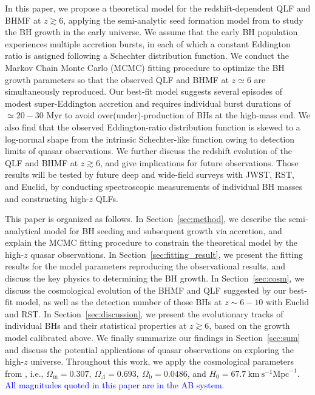 \documentclass[twocolumn, twocolappendix]{aastex63}
\newcommand{\blue}[1]{\textcolor{blue}{ #1}}
\begin{document}
\begin{CJK*}{UTF8}{gbsn}
In this paper, we propose a theoretical model for the redshift-dependent QLF and BHMF at $z\gtrsim 6$,
applying the semi-analytic seed formation model from \cite{2021ApJ...917...60L} to study the BH growth in the early universe.
We assume that the early BH population experiences multiple accretion bursts, in each of which a constant Eddington ratio is assigned 
following a Schechter distribution function. 
We conduct the Markov Chain Monte Carlo (MCMC) fitting procedure to optimize the BH growth parameters 
so that the observed QLF and BHMF at $z\simeq 6$ are simultaneously reproduced. 
Our best-fit model suggests several episodes of modest super-Eddington accretion and requires
individual burst durations of $\simeq 20-30$ Myr to avoid over(under)-production of BHs at the high-mass end.
We also find that the observed Eddington-ratio distribution function is skewed to a log-normal shape from the intrinsic Schechter-like function
owing to detection limits of quasar observations.
We further discuss the redshift evolution of the QLF and BHMF at $z\gtrsim 6$,
and give implications for future observations.
Those results will be tested by future deep and wide-field surveys with JWST, RST, and Euclid,
by conducting spectroscopic measurements of individual BH masses and constructing high-$z$ QLFs.  



This paper is organized as follows. 
In Section~\ref{sec:method}, we describe the semi-analytical model for BH seeding and subsequent growth via accretion,
and explain the MCMC fitting procedure to constrain the theoretical model by the high-$z$ quasar observations.
In Section~\ref{sec:fitting_result}, we present the fitting results for the model parameters reproducing the observational results,
and discuss the key physics to determining the BH growth.
In Section~\ref{sec:cosm}, we discuss the cosmological evolution of the BHMF and QLF suggested by our best-fit model,
as well as the detection number of those BHs at $z\sim 6-10$ with Euclid and RST.
In Section~\ref{sec:discussion}, we present the evolutionary tracks of individual BHs and their statistical properties at $z\gtrsim 6$,
based on the growth model calibrated above.
We finally summarize our findings in Section~\ref{sec:sum} and discuss the potential applications of quasar observations on 
exploring the high-$z$ universe.
Throughout this work, we apply the cosmological parameters from \cite{2016A&A...594A..13P},
i.e., $\Omega_{\mathrm{m}}=0.307,~\Omega_{\Lambda}=0.693,~
\Omega_{\mathrm{b}}=0.0486$, and $H_0=67.7 \mathrm{~km} \mathrm{~s}^{-1} \mathrm{Mpc}^{-1}$.
\blue{All magnitudes quoted in this paper are in the AB system.}




\end{CJK*}
\end{document}
